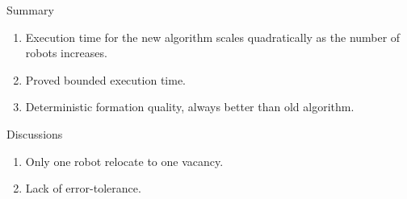 \begin{frame}{Summary}
  \begin{enumerate}
  \item Execution time for the new
    algorithm scales quadratically as the number of robots increases.
  \item Proved bounded execution time.
  \item Deterministic formation quality, always better than old algorithm.
  \end{enumerate}
  Discussions
  \begin{enumerate}
  \item Only one robot relocate to one vacancy.
  \item Lack of error-tolerance.
  \end{enumerate}
\end{frame}